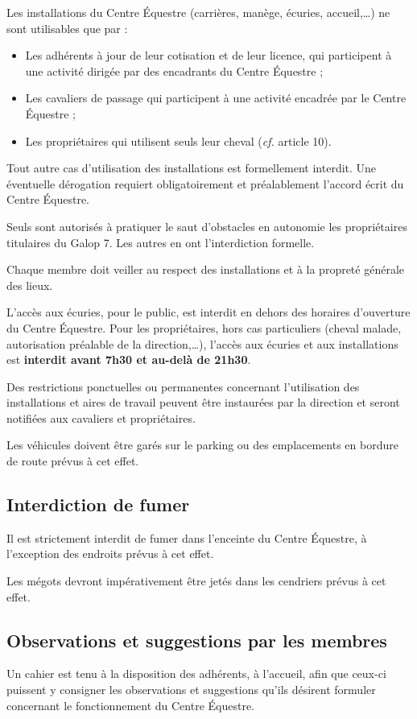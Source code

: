 \documentclass[11pt,a4paper]{article}
\begin{document}
Les installations du Centre Équestre (carrières, manège, écuries, accueil,\dots) ne sont utilisables que par :
\begin{itemize}[leftmargin=50pt]
\item
Les adhérents à jour de leur cotisation et de leur licence, qui participent à une activité dirigée par des encadrants du Centre Équestre ;
\item
Les cavaliers \og de passage \fg{} qui participent à une activité encadrée par le Centre Équestre ;
\item
Les propriétaires qui utilisent seuls leur cheval (\textit{cf.} article 10).
\end{itemize}

Tout autre cas d'utilisation des installations est formellement interdit.
Une éventuelle dérogation requiert obligatoirement et préalablement l'accord écrit du Centre Équestre.

Seuls sont autorisés à pratiquer le saut d'obstacles en autonomie les propriétaires titulaires du Galop 7.
Les autres en ont l'interdiction formelle.

Chaque membre doit veiller au respect des installations et à la propreté générale des lieux.

L'accès aux écuries, pour le public, est interdit en dehors des horaires d'ouverture du Centre Équestre.
Pour les propriétaires, hors cas particuliers (cheval malade, autorisation préalable de la direction,\dots), l'accès aux écuries et aux installations est \textbf{interdit avant 7h30 et au-delà de 21h30}.

Des restrictions ponctuelles ou permanentes concernant l'utilisation des installations et aires de travail peuvent être instaurées par la direction et seront notifiées aux cavaliers et propriétaires.

Les véhicules doivent être garés sur le parking ou des emplacements en bordure de route prévus à cet effet.

\subsection{Interdiction de fumer}\label{subsec:interdiction-de-fumer}
Il est strictement interdit de fumer dans l'enceinte du Centre Équestre, à l'exception des endroits prévus à cet effet.

Les mégots devront impérativement être jetés dans les cendriers prévus à cet effet.

\subsection{Observations et suggestions par les membres}\label{subsec:observations-et-suggestions-par-les-membres}
Un cahier est tenu à la disposition des adhérents, à l'accueil, afin que ceux-ci puissent y consigner les observations et suggestions qu'ils désirent formuler concernant le fonctionnement du Centre Équestre.
\end{document}
